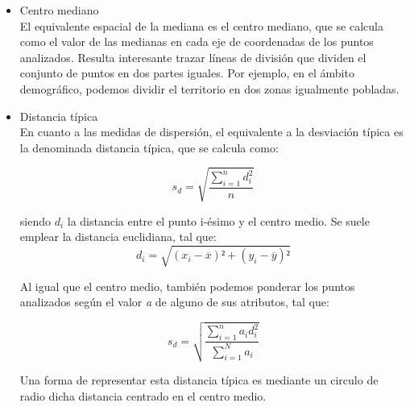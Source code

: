 \begin{itemize}
\begin{itemize}
        \item Centro mediano \\
        El equivalente espacial de la mediana es el centro mediano, que se calcula como el valor de las medianas en cada eje de coordenadas de los puntos analizados.
        Resulta interesante trazar líneas de división que dividen el conjunto de puntos en dos partes iguales.
        Por ejemplo, en el ámbito demográfico, podemos dividir el territorio en dos zonas igualmente pobladas.

        \item Distancia típica \\
        En cuanto a las medidas de dispersión, el equivalente a la desviación típica es la denominada distancia típica, que se calcula como:

        \begin{equation} s_d = \sqrt{\frac{\displaystyle\sum_{i=1}^n d^2_i}{n}} \nonumber \end{equation}

        siendo $d_i$ la distancia entre el punto i-ésimo y el centro medio. 
        Se suele emplear la distancia euclidiana, tal que:
        \begin{equation}
            d_i = \sqrt{(x_i-\overline{x})² + (y_i-\overline{y})²} \nonumber
        \end{equation}

        Al igual que el centro medio, también podemos ponderar los puntos analizados según el valor \textit{a} de alguno de sus atributos, tal que:

        \begin{equation} s_d = \sqrt{\frac{\displaystyle\sum_{i=1}^n a_i d_i^2}{\displaystyle\sum_{i=1}^N a_i}} \nonumber \end{equation}

        Una forma de representar esta distancia típica es mediante un circulo de radio dicha distancia centrado en el centro medio.
    \end{itemize}
\end{itemize}

